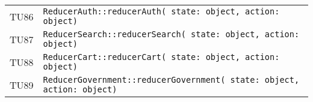 \begin{longtable}{ >{\centering}p{} >{}p{}}
			\hypertarget{TU86}{TU86} & 
			\texttt{ReducerAuth::reducerAuth( state: object, action: object)}\\
			
			\hypertarget{TU87}{TU87} & 
			\texttt{ReducerSearch::reducerSearch( state: object, action: 
			object)}\\
		
			\hypertarget{TU88}{TU88} & 
			\texttt{ReducerCart::reducerCart( state: object, action: object)}\\
			
			\hypertarget{TU89}{TU89} & 
			\texttt{ReducerGovernment::reducerGovernment( state: object, 
			action: object)}\\

		\end{longtable}
